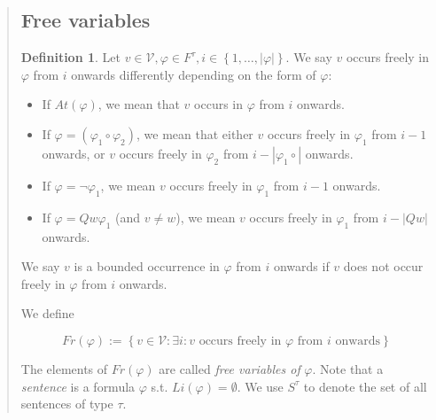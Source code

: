 \documentclass[a4paper, 12pt]{article}
\theoremstyle{definition}
\theoremstyle{definition}
\theoremstyle{definition}
\newtheorem{definition}{Definition}
\begin{document}
\begin{quote}
\begin{quote}
\end{quote}
\normalsize


\subsection{Free variables}

\begin{definition}
    Let $v \in \mathcal{V}, \varphi \in F^\tau, i \in \left\{ 1, \ldots,
    |\varphi| \right\} $. We say $v$ occurs freely in $\varphi$ from $i$
    onwards differently depending on the form of $\varphi$:

    \begin{itemize}
        \item If $At(\varphi)$, we mean that $v$ occurs in $\varphi$ from $i$ onwards. 
        \item If $\varphi = (\varphi_1 \circ \varphi_2)$, we mean that either $v$ occurs freely 
            in $\varphi_1$ from $i - 1$ onwards, or $v$ occurs freely 
            in $\varphi_2$ from $i - | \varphi_1 \circ|$ onwards. 
        \item If $\varphi = \neg \varphi_1$, we mean $v$ occurs freely 
            in $\varphi_1$ from $i - 1$ onwards. 
        \item If $\varphi = Q w \varphi_1$ (and $v \neq w$), we mean $v$ occurs
            freely in $\varphi_1$ from $i - |Qw|$ onwards. 
    \end{itemize}

    We say $v$ is a bounded occurrence in $\varphi$ from $i$ onwards if $v$ does not 
    occur freely in $\varphi$ from $i$ onwards.
\end{definition}

We define 

\begin{equation*}
    Fr(\varphi) := \left\{ v \in \mathcal{V} : \exists i : v \text{ occurs freely in } \varphi \text{ from $i$ onwards} \right\} 
\end{equation*}

The elements of $Fr(\varphi)$ are called \textit{free variables of} $\varphi$.
Note that a \textit{sentence} is a formula $\varphi$ s.t. $Li(\varphi) =
\emptyset$. We use $S^\tau$ to denote the set of all sentences of type $\tau$.


\end{quote}
\end{document}

